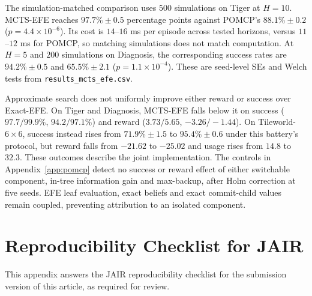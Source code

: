 \documentclass[manuscript, screen, review]{jair}
\begin{document}
The simulation-matched comparison uses $500$ simulations on Tiger at $H=10$. MCTS-EFE reaches $97.7\%\pm0.5$ percentage points against POMCP's $88.1\%\pm0.2$ ($p=4.4\times10^{-6}$). Its cost is $14$--$16$ ms per episode across tested horizons, versus $11$--$12$ ms for POMCP, so matching simulations does not match computation. At $H=5$ and $200$ simulations on Diagnosis, the corresponding success rates are $94.2\%\pm0.5$ and $65.5\%\pm2.1$ ($p=1.1\times10^{-4}$). These are seed-level SEs and Welch tests from \texttt{results\_\allowbreak mcts\_\allowbreak efe.csv}.

Approximate search does not uniformly improve either reward or success over Exact-EFE. On Tiger and Diagnosis, MCTS-EFE falls below it on success ($97.7/99.9\%$, $94.2/97.1\%$) and reward ($3.73/5.65$, $-3.26/-1.44$). On Tileworld-$6\times6$, success instead rises from $71.9\%\pm1.5$ to $95.4\%\pm0.6$ under this battery's protocol, but reward falls from $-21.62$ to $-25.02$ and usage rises from $14.8$ to $32.3$. These outcomes describe the joint implementation. The controls in Appendix~\ref{app:pomcp} detect no success or reward effect of either switchable component, in-tree information gain and max-backup, after Holm correction at five seeds. EFE leaf evaluation, exact beliefs and exact commit-child values remain coupled, preventing attribution to an isolated component.

\FloatBarrier
\section{Reproducibility Checklist for JAIR}
\label{app:repro}

This appendix answers the JAIR reproducibility checklist \citep{gundersen2024jair} for the submission version of this article, as required for review.
\end{document}
